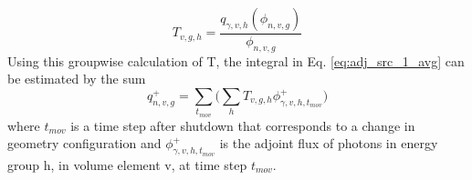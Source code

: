 \begin{equation}\label{eq:T}
	T_{v,g,h} = \dfrac{q_{\gamma,v,h}(\phi_{n,v,g})}{\phi_{n,v,g}}
\end{equation}
Using this groupwise calculation of T, the integral in Eq. \ref{eq:adj_src_1_avg} can be estimated by the sum
\begin{equation}\label{eq:tgt_n_src}
	q_{n,v,g}^{+} =
	\sum_{t_{mov}}\Bigg(\sum_{h} T_{v,g,h} \phi_{\gamma,v,h,t_{mov}}^{+}\Bigg)
\end{equation}
where $t_{mov}$ is a time step after shutdown that corresponds to a change in
geometry configuration and $\phi_{\gamma,v,h,t_{mov}}^{+}$ is the adjoint flux
of photons in energy group h, in volume element v, at time step $t_{mov}$.
